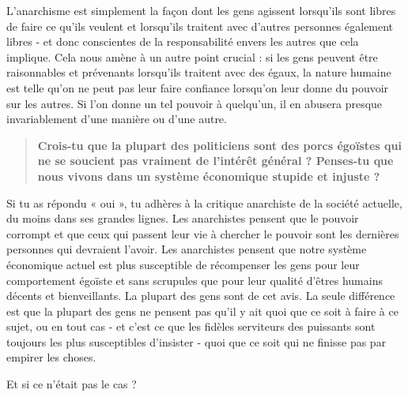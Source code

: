 L'anarchisme est simplement la façon dont les gens agissent lorsqu'ils sont libres de faire ce qu'ils veulent et lorsqu'ils traitent avec d'autres personnes également libres - et donc conscientes de la responsabilité envers les autres que cela implique. Cela nous amène à un autre point crucial : si les gens peuvent être raisonnables et prévenants lorsqu'ils traitent avec des égaux, la nature humaine est telle qu'on ne peut pas leur faire confiance lorsqu'on leur donne du pouvoir sur les autres. Si l'on donne un tel pouvoir à quelqu'un, il en abusera presque invariablement d'une manière ou d'une autre.

\begin{quotation}
\textbf{Crois-tu que la plupart des politiciens sont des porcs égoïstes qui ne se soucient pas vraiment de l'intérêt général ? Penses-tu que nous vivons dans un système économique stupide et injuste ?}
\end{quotation}

Si tu as répondu « oui », tu adhères à la critique anarchiste de la société actuelle, du moins dans ses grandes lignes. Les anarchistes pensent que le pouvoir corrompt et que ceux qui passent leur vie à chercher le pouvoir sont les dernières personnes qui devraient l'avoir. Les anarchistes pensent que notre système économique actuel est plus susceptible de récompenser les gens pour leur comportement égoïste et sans scrupules que pour leur qualité d'êtres humains décents et bienveillants. La plupart des gens sont de cet avis. La seule différence est que la plupart des gens ne pensent pas qu'il y ait quoi que ce soit à faire à ce sujet, ou en tout cas - et c'est ce que les fidèles serviteurs des puissants sont toujours les plus susceptibles d'insister - quoi que ce soit qui ne finisse pas par empirer les choses.

Et si ce n'était pas le cas ?

